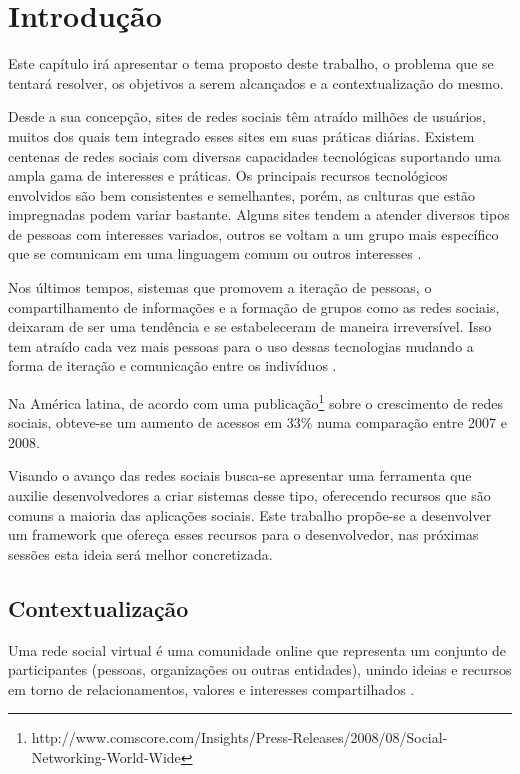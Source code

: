 \chapter[Introdução]{Introdução}

Este capítulo irá apresentar o tema proposto deste trabalho, o problema que se tentará resolver, os objetivos a serem alcançados e a contextualização do mesmo.

Desde a sua concepção, sites de redes sociais têm atraído milhões de usuários, muitos dos quais tem integrado esses sites em suas práticas diárias. Existem centenas de redes sociais com diversas capacidades tecnológicas suportando uma ampla gama de interesses e práticas. Os principais recursos tecnológicos envolvidos são bem consistentes e semelhantes, porém, as culturas que estão impregnadas podem variar bastante. Alguns sites tendem a atender diversos tipos de pessoas com interesses variados, outros se voltam a um grupo mais específico que se comunicam em uma linguagem comum ou outros interesses \cite{Boyd:Ellison:2007}.

Nos últimos tempos, sistemas que promovem a iteração de pessoas, o compartilhamento de informações e a formação de grupos como as redes sociais, deixaram de ser uma tendência e se estabeleceram de maneira irreversível. Isso tem atraído cada vez mais pessoas para o uso dessas tecnologias mudando a forma de iteração e comunicação entre os indivíduos \cite{Santana:Melo-Solarte:Neris:Miranda:Baranauskas:2009}.

Na América latina, de acordo com uma publicação\footnote{http://www.comscore.com/Insights/Press-Releases/2008/08/Social-Networking-World-Wide} sobre o crescimento de redes sociais, obteve-se um aumento de acessos em 33\% numa comparação entre 2007 e 2008.

Visando o avanço das redes sociais busca-se apresentar uma ferramenta que auxilie desenvolvedores a criar sistemas desse tipo, oferecendo recursos que são comuns a maioria das aplicações sociais. Este trabalho propõe-se a desenvolver um framework que ofereça esses recursos para o desenvolvedor, nas próximas sessões esta ideia será melhor concretizada.

\section{Contextualização}

Uma rede social virtual é uma comunidade online que representa um conjunto de participantes (pessoas, organizações ou outras entidades), unindo ideias e recursos em torno de relacionamentos, valores e interesses compartilhados \cite{Marteleto:2001}.


